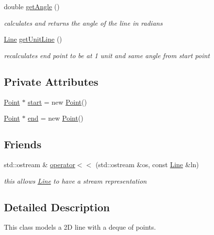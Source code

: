 \begin{DoxyCompactItemize}
double \mbox{\hyperlink{class_jinks_draw_1_1_line_ae344d8ad62e6044cfa2a5d31e1262d00}{get\+Angle}} ()
\begin{DoxyCompactList}\small\item\em calculates and returns the angle of the line in radians \end{DoxyCompactList}\item 
\mbox{\hyperlink{class_jinks_draw_1_1_line}{Line}} \mbox{\hyperlink{class_jinks_draw_1_1_line_a0cfaefbf55c982b045562e34c576ce81}{get\+Unit\+Line}} ()
\begin{DoxyCompactList}\small\item\em recalculates end point to be at 1 unit and same angle from start point \end{DoxyCompactList}\end{DoxyCompactItemize}
\subsection*{Private Attributes}
\begin{DoxyCompactItemize}
\item 
\mbox{\hyperlink{class_jinks_draw_1_1_point}{Point}} $\ast$ \mbox{\hyperlink{class_jinks_draw_1_1_line_a697fccb64f32b900f86dbc89ac69fec3}{start}} = new \mbox{\hyperlink{class_jinks_draw_1_1_point}{Point}}()
\item 
\mbox{\hyperlink{class_jinks_draw_1_1_point}{Point}} $\ast$ \mbox{\hyperlink{class_jinks_draw_1_1_line_a6c04e4d06b7c8bafff608b1ffae6169b}{end}} = new \mbox{\hyperlink{class_jinks_draw_1_1_point}{Point}}()
\end{DoxyCompactItemize}
\subsection*{Friends}
\begin{DoxyCompactItemize}
\item 
std\+::ostream \& \mbox{\hyperlink{class_jinks_draw_1_1_line_a9ed7047351912d1052d709dfa4aac3c9}{operator$<$$<$}} (std\+::ostream \&os, const \mbox{\hyperlink{class_jinks_draw_1_1_line}{Line}} \&ln)
\begin{DoxyCompactList}\small\item\em this allows \mbox{\hyperlink{class_jinks_draw_1_1_line}{Line}} to have a stream representation \end{DoxyCompactList}\end{DoxyCompactItemize}


\subsection{Detailed Description}
This class models a 2D line with a deque of points. 

